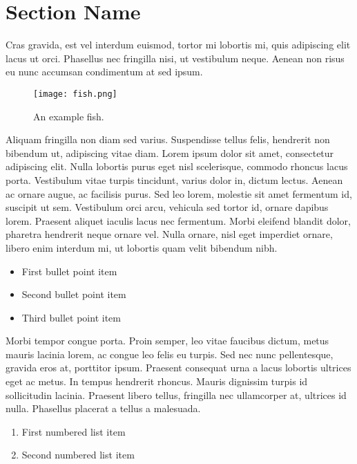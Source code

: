 \documentclass[11pt]{diazessay} %
\begin{document}

\section*{Section Name}

Cras gravida, est vel interdum euismod, tortor mi lobortis mi, quis adipiscing elit lacus ut orci. Phasellus nec fringilla nisi, ut vestibulum neque. Aenean non risus eu nunc accumsan condimentum at sed ipsum.
\begin{wrapfigure}{l}{0.42\textwidth} %
	\texttt{[image: fish.png]}
	\caption{An example fish.}
\end{wrapfigure}
Aliquam fringilla non diam sed varius. Suspendisse tellus felis, hendrerit non bibendum ut, adipiscing vitae diam. Lorem ipsum dolor sit amet, consectetur adipiscing elit. Nulla lobortis purus eget nisl scelerisque, commodo rhoncus lacus porta. Vestibulum vitae turpis tincidunt, varius dolor in, dictum lectus. Aenean ac ornare augue, ac facilisis purus. Sed leo lorem, molestie sit amet fermentum id, suscipit ut sem. Vestibulum orci arcu, vehicula sed tortor id, ornare dapibus lorem. Praesent aliquet iaculis lacus nec fermentum. Morbi eleifend blandit dolor, pharetra hendrerit neque ornare vel. Nulla ornare, nisl eget imperdiet ornare, libero enim interdum mi, ut lobortis quam velit bibendum nibh.

\begin{itemize}
	\item First bullet point item
	\item Second bullet point item
	\item Third bullet point item
\end{itemize}

Morbi tempor congue porta. Proin semper, leo vitae faucibus dictum, metus mauris lacinia lorem, ac congue leo felis eu turpis. Sed nec nunc pellentesque, gravida eros at, porttitor ipsum. Praesent consequat urna a lacus lobortis ultrices eget ac metus. In tempus hendrerit rhoncus. Mauris dignissim turpis id sollicitudin lacinia. Praesent libero tellus, fringilla nec ullamcorper at, ultrices id nulla. Phasellus placerat a tellus a malesuada.

\begin{enumerate}
	\item First numbered list item
	\item Second numbered list item
\end{enumerate}
\end{document}
